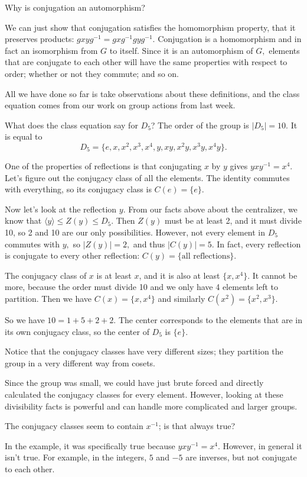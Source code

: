  
\begin{question}
Why is conjugation an automorphism?
\end{question}
\begin{ans}
We can just show that conjugation satisfies the homomorphism property, that it preserves products: $gxyg^{-1} = gxg^{-1}gyg^{-1}.$
Conjugation is a homomorphism and in fact an isomorphism from $G$ to itself. Since it is an automorphism of $G,$ elements that are conjugate to each other will have the same properties with respect to order; whether or not they commute; and so on. 
\end{ans}

All we have done so far is take observations about these definitions, and the class equation comes from our work on group actions from last week.

\begin{example}
What does the class equation say for $D_5$? The order of the group is $|D_5| = 10.$ It is equal to 
\[
D_5 = \{e, x, x^2, x^3, x^4, y, xy, x^2y, x^3y, x^4y\}.
\]

One of the properties of reflections is that conjugating $x$ by $y$ gives $yxy^{-1} = x^4.$
Let's figure out the conjugacy class of all the elements. 
The identity commutes with everything, so its conjugacy class is $C(e) = \{e\}.$ 

Now let's look at the reflection $y$.
From our facts above about the centralizer, we know that $\langle y \rangle \leq Z(y) \leq D_5.$ Then $Z(y)$ must be at least 2, and it must divide 10, so 2 and 10 are our only possibilities. 
However, not every element in $D_5$ commutes with $y,$ so $|Z(y)| = 2,$ and thus $|C(y)| = 5.$ In fact, every reflection is conjugate to every other reflection: $C(y) = \{\text{all reflections}\}.$ 

The conjugacy class of $x$ is at least $x$, and it is also at least $\{x, x^4\}.$ It cannot be more, because the order must divide 10 and we only have 4 elements left to partition. Then we have $C(x) = \{x, x^4\}$ and similarly $C(x^2) = \{x^2, x^3\}.$

So we have $10 = 1 + 5 + 2 + 2.$ 
The center corresponds to the elements that are in its own conjugacy class, so the center of $D_5$ is $\{e\}.$
\end{example}
Notice that the conjugacy classes have very different sizes; they partition the group in a very different way from cosets.

Since the group was small, we could have just brute forced and directly calculated the conjugacy classes for every element. However, looking at these divisibility facts is powerful and can handle more complicated and larger groups.
\begin{question}
The conjugacy classes seem to contain $x^{-1}$; is that always true?
\end{question}
\begin{ans}
In the example, it was specifically true because $yxy^{-1} = x^4$.
However, in general it isn't true.
For example, in the integers, $5$ and $-5$ are inverses, but not conjugate to each other.
\end{ans}

